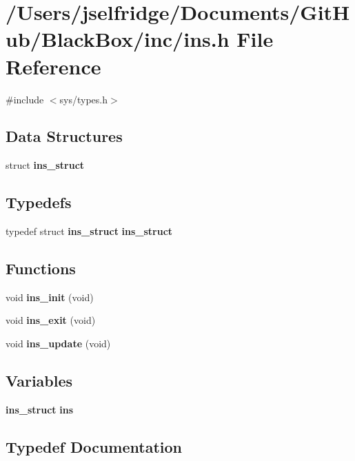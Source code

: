 \section{/\+Users/jselfridge/\+Documents/\+Git\+Hub/\+Black\+Box/inc/ins.h File Reference}
\label{ins_8h}
{\ttfamily \#include $<$sys/types.\+h$>$}\newline
\subsection*{Data Structures}
\begin{DoxyCompactItemize}
\item 
struct \textbf{ ins\+\_\+struct}
\end{DoxyCompactItemize}
\subsection*{Typedefs}
\begin{DoxyCompactItemize}
\item 
typedef struct \textbf{ ins\+\_\+struct} \textbf{ ins\+\_\+struct}
\end{DoxyCompactItemize}
\subsection*{Functions}
\begin{DoxyCompactItemize}
\item 
void \textbf{ ins\+\_\+init} (void)
\item 
void \textbf{ ins\+\_\+exit} (void)
\item 
void \textbf{ ins\+\_\+update} (void)
\end{DoxyCompactItemize}
\subsection*{Variables}
\begin{DoxyCompactItemize}
\item 
\textbf{ ins\+\_\+struct} \textbf{ ins}
\end{DoxyCompactItemize}


\subsection{Typedef Documentation}
\mbox{\label{ins_8h_ace7928aba87f564d8081ebbb1c20ae8c}} 
